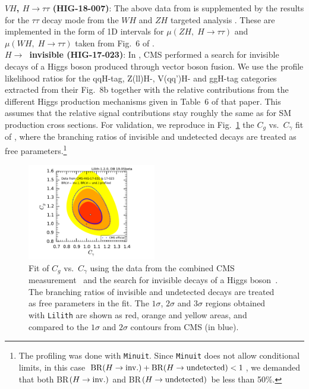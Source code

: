 {\bf\boldmath $VH$, $H\to\tau\tau$ (HIG-18-007)}: The above data from \cite{Sirunyan:2018koj} is supplemented by the results 
for the $\tau\tau$ decay mode from the $WH$ and $ZH$ targeted analysis \cite{Sirunyan:2018cpi}. These are implemented in the 
form of 1D intervals for $\mu(ZH,\;H\to\tau\tau)$ and $\mu(WH,\;H\to\tau\tau)$ taken from Fig.~6 of \cite{Sirunyan:2018cpi}. \\

{\bf\boldmath $H\to$~invisible (HIG-17-023)}: 
In \cite{Sirunyan:2018owy}, CMS performed a search for invisible decays of a Higgs boson produced through vector boson fusion. 
We use the profile likelihood ratios for the qqH-tag, Z(ll)H-, V(qq')H- and ggH-tag categories extracted 
from their Fig.~8b together with the relative contributions from the different Higgs production mechanisms  
given in Table~6 of that paper. This assumes that the relative signal contributions stay roughly the same as for 
SM production cross sections. For validation, we reproduce in Fig.~\ref{fig:validation_cms_inv}
 the $C_g$ vs.\ $C_\gamma$ fit of \cite{Sirunyan:2018koj}, where the branching ratios of invisible and undetected decays 
are treated as free parameters.\footnote{The profiling was done with {\tt Minuit}. Since {\tt Minuit} does not allow conditional limits, in this case 
${\rm BR}(H\to {\rm inv.})+{\rm BR}(H\to {\rm undetected})<1$, we demanded that both BR$(H\to {\rm inv.})$ and BR$(H\to {\rm undetected})$ 
be less than 50\%.} 

\begin{figure}[t!]\centering
\includegraphics[width=0.5\textwidth]{validation/CMS/HIG-17-031-CgCGa_BRinvBRund_profiled.pdf}
\caption{Fit of $C_g$ vs.\ $C_\gamma$ using the data from the combined CMS measurement~\cite{Sirunyan:2018koj} and the 
search for invisible decays of a Higgs boson~\cite{Sirunyan:2018owy}. The branching ratios of invisible and undetected decays 
are treated as free parameters in the fit. 
The  $1\sigma$,  $2\sigma$ and $3\sigma$ regions obtained with {\tt Lilith} are shown as red, orange and yellow areas, 
and compared to the $1\sigma$ and $2\sigma$ contours from CMS (in blue).}
\label{fig:validation_cms_inv}
\end{figure}


